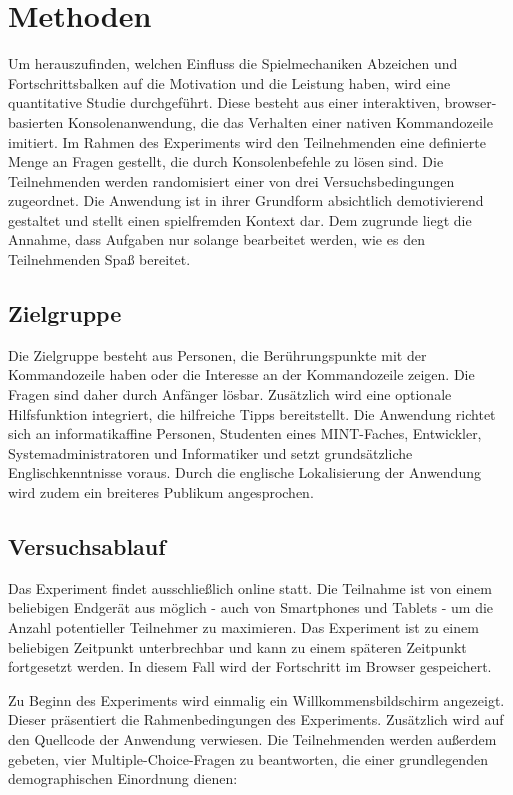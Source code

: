 \section{Methoden}

Um herauszufinden, welchen Einfluss die Spielmechaniken Abzeichen und Fortschrittsbalken auf die Motivation und die Leistung haben, wird eine quantitative Studie durchgeführt. Diese besteht aus einer interaktiven, browser-basierten Konsolenanwendung, die das Verhalten einer nativen Kommandozeile imitiert. Im Rahmen des Experiments wird den Teilnehmenden eine definierte Menge an Fragen gestellt, die durch Konsolenbefehle zu lösen sind. Die Teilnehmenden werden randomisiert einer von drei Versuchsbedingungen zugeordnet. Die Anwendung ist in ihrer Grundform absichtlich demotivierend gestaltet und stellt einen spielfremden Kontext dar. Dem zugrunde liegt die Annahme, dass Aufgaben nur solange bearbeitet werden, wie es den Teilnehmenden Spaß bereitet.

\subsection{Zielgruppe}
Die Zielgruppe besteht aus Personen, die Berührungspunkte mit der Kommandozeile haben oder die Interesse an der Kommandozeile zeigen. Die Fragen sind daher durch Anfänger lösbar. Zusätzlich wird eine optionale Hilfsfunktion integriert, die hilfreiche Tipps bereitstellt. Die Anwendung richtet sich an informatikaffine Personen, Studenten eines MINT-Faches, Entwickler, Systemadministratoren und Informatiker und setzt grundsätzliche Englischkenntnisse voraus. Durch die englische Lokalisierung der Anwendung wird zudem ein breiteres Publikum angesprochen.

\subsection{Versuchsablauf}
Das Experiment findet ausschließlich online statt. Die Teilnahme ist von einem beliebigen Endgerät aus möglich - auch von Smartphones und Tablets - um die Anzahl potentieller Teilnehmer zu maximieren. Das Experiment ist zu einem beliebigen Zeitpunkt unterbrechbar und kann zu einem späteren Zeitpunkt fortgesetzt werden. In diesem Fall wird der Fortschritt im Browser gespeichert.

Zu Beginn des Experiments wird einmalig ein Willkommensbildschirm angezeigt. Dieser präsentiert die Rahmenbedingungen des Experiments. Zusätzlich wird auf den Quellcode der Anwendung verwiesen. Die Teilnehmenden werden außerdem gebeten, vier Multiple-Choice-Fragen zu beantworten, die einer grundlegenden demographischen Einordnung dienen:

